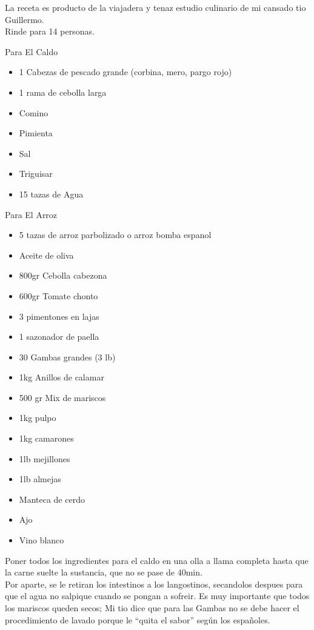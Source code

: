 La receta es producto de la viajadera y tenaz estudio culinario de mi cansado tio Guillermo.\\

Rinde para 14 personas.


\begin{ingredientes}
\item Para El Caldo
\begin{itemize}
\item 1 Cabezas de pescado grande (corbina, mero, pargo rojo)
\item 1 rama de cebolla larga
\item Comino
\item Pimienta
\item Sal
\item Triguisar
\item 15 tazas de Agua
\end{itemize}
\item Para El Arroz
\begin{itemize}
\item 5 tazas de arroz parbolizado o arroz bomba espanol
\item Aceite de oliva
\item 800gr Cebolla cabezona
\item 600gr Tomate chonto
\item 3 pimentones en lajas
\item 1 sazonador de paella
\item 30 Gambas grandes (3 lb)
\item 1kg Anillos de calamar
\item 500 gr Mix de mariscos
\item 1kg pulpo
\item 1kg camarones
\item 1lb mejillones
\item 1lb almejas
\item Manteca de cerdo
\item Ajo
\item Vino blanco
\end{itemize}
\end{ingredientes}
\preparacion
Poner todos los ingredientes para el caldo en una olla a llama completa hasta que la carne suelte la sustancia, que no se pase de 40min.\\

Por aparte, se le retiran los intestinos a los langostinos, secandolos despues para que el agua no salpique cuando se pongan a sofreir. Es muy importante que todos los mariscos queden secos; Mi tio dice que para las Gambas no se debe hacer el procedimiento de lavado porque le “quita el sabor” según los españoles.\\

